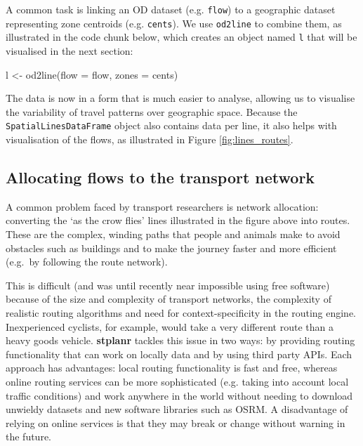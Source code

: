 A common task is linking an OD dataset (e.g. \texttt{flow}) to a geographic dataset
representing zone centroids (e.g. \texttt{cents}).
We use \texttt{od2line} to combine them, as illustrated in the code chunk below,
which creates an object named \texttt{l} that will be visualised
in the next section:

\begin{Schunk}
\begin{Sinput}
l <- od2line(flow = flow, zones = cents)
\end{Sinput}
\end{Schunk}

The data is now in a form that is much easier to analyse, allowing us to visualise
the variability of travel patterns over geographic space.
Because the \texttt{SpatialLinesDataFrame} object also contains
data per line, it also helps with visualisation of the flows, as
illustrated in Figure \ref{fig:lines_routes}.

\subsection{Allocating flows to the transport
network}\label{allocating-flows-to-the-transport-network}

A common problem faced by transport researchers is network allocation:
converting the `as the crow flies' lines illustrated in the figure above
into routes. These are the complex, winding paths that people and
animals make to avoid obstacles such as buildings and to make the
journey faster and more efficient (e.g.~by following the route network).

This is difficult (and was until recently near impossible using free
software) because of the size and complexity of transport networks, the
complexity of realistic routing algorithms and need for
context-specificity in the routing engine. Inexperienced cyclists, for
example, would take a very different route than a heavy goods vehicle.
\textbf{stplanr} tackles this issue in two ways: by providing routing
functionality that can work on locally data and by using third party APIs.
Each approach has advantages: local routing functionality is fast and free,
whereas online routing services can be more sophisticated (e.g. taking
into account local traffic conditions) and work anywhere in the world
without needing to download unwieldy datasets and new software libraries such
as OSRM.
A disadvantage of relying on online services is that they may break or change
without warning in the future.

